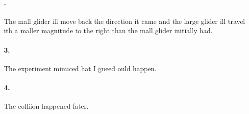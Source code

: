     \paragraph*{.}
    The mall glider ill move back the direction it came and the large glider ill travel ith a maller magnitude to the right than the mall glider initially had.

    \paragraph*{3.}
    The experiment mimiced hat I gueed ould happen.

    \paragraph*{4.}
    The colliion happened fater.

